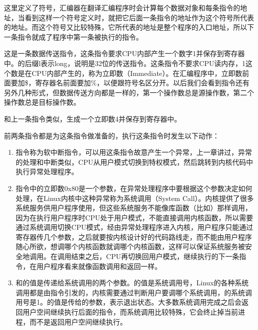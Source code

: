 

这里定义了符号，汇编器在翻译汇编程序时会计算每个数据对象和每条指令的地址，当看到这样一个符号定义时，就把它后面一条指令的地址作为这个符号所代表的地址。而这个符号又比较特殊，它所代表的地址是整个程序的入口地址，所以下一条指令就成了程序中第一条被执行的指令。




这是一条数据传送指令，这条指令要求CPU内部产生一个数字1并保存到寄存器中。的后缀l表示long，说明是32位的传送指令。这条指令不要求CPU读内存，1这个数是在CPU内部产生的，称为立即数（Immediate）。在汇编程序中，立即数前面要加\$，寄存器名前面要加\%，以便跟符号名区分开。以后我们会看到指令还有另外几种形式，但数据传送方向都是一样的，第一个操作数总是源操作数，第二个操作数总是目标操作数。




和上一条指令类似，生成一个立即数4并保存到寄存器中。




前两条指令都是为这条指令做准备的，执行这条指令时发生以下动作：


\begin{enumerate}

\item {}指令称为软中断指令，可以用这条指令故意产生一个异常，上一章讲过，异常的处理和中断类似，CPU从用户模式切换到特权模式，然后跳转到内核代码中执行异常处理程序。

\item {}指令中的立即数0x80是一个参数，在异常处理程序中要根据这个参数决定如何处理，在Linux内核中这种异常称为系统调用（System Call）。内核提供了很多系统服务供用户程序使用，但这些系统服务不能像库函数（比如）那样调用，因为在执行用户程序时CPU处于用户模式，不能直接调用内核函数，所以需要通过系统调用切换CPU模式，经由异常处理程序进入内核，用户程序只能通过寄存器传几个参数，之后就要按内核设计好的代码路线走，而不能由用户程序随心所欲，想调哪个内核函数就调哪个内核函数，这样可以保证系统服务被安全地调用。在调用结束之后，CPU再切换回用户模式，继续执行的下一条指令，在用户程序看来就像函数调用和返回一样。

\item {}和的值是传递给系统调用的两个参数。的值是系统调用号，Linux的各种系统调用都是由指令引发的，内核需要通过判断用户要调哪个系统调用，的系统调用号是1。的值是传给的参数，表示退出状态。大多数系统调用完成之后会返回用户空间继续执行后面的指令，而系统调用比较特殊，它会终止掉当前进程，而不是返回用户空间继续执行。
\end{enumerate}

